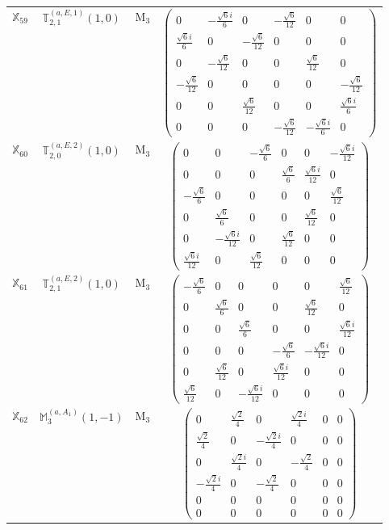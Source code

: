 \documentclass[fleqn,10pt,landscape]{article}
\begin{document}
\begin{itemize}
\begin{center}
\begin{longtable}{c|c|c|c}
$ \mathbb{X}_{59} $ & $\mathbb{T}_{2,1}^{(a,E,1)}(1,0)$ & M$_{3}$ & $\begin{pmatrix} 0 & - \frac{\sqrt{6} i}{6} & 0 & - \frac{\sqrt{6}}{12} & 0 & 0 \\ \frac{\sqrt{6} i}{6} & 0 & - \frac{\sqrt{6}}{12} & 0 & 0 & 0 \\ 0 & - \frac{\sqrt{6}}{12} & 0 & 0 & \frac{\sqrt{6}}{12} & 0 \\ - \frac{\sqrt{6}}{12} & 0 & 0 & 0 & 0 & - \frac{\sqrt{6}}{12} \\ 0 & 0 & \frac{\sqrt{6}}{12} & 0 & 0 & \frac{\sqrt{6} i}{6} \\ 0 & 0 & 0 & - \frac{\sqrt{6}}{12} & - \frac{\sqrt{6} i}{6} & 0 \end{pmatrix}$ \\
$ \mathbb{X}_{60} $ & $\mathbb{T}_{2,0}^{(a,E,2)}(1,0)$ & M$_{3}$ & $\begin{pmatrix} 0 & 0 & - \frac{\sqrt{6}}{6} & 0 & 0 & - \frac{\sqrt{6} i}{12} \\ 0 & 0 & 0 & \frac{\sqrt{6}}{6} & \frac{\sqrt{6} i}{12} & 0 \\ - \frac{\sqrt{6}}{6} & 0 & 0 & 0 & 0 & \frac{\sqrt{6}}{12} \\ 0 & \frac{\sqrt{6}}{6} & 0 & 0 & \frac{\sqrt{6}}{12} & 0 \\ 0 & - \frac{\sqrt{6} i}{12} & 0 & \frac{\sqrt{6}}{12} & 0 & 0 \\ \frac{\sqrt{6} i}{12} & 0 & \frac{\sqrt{6}}{12} & 0 & 0 & 0 \end{pmatrix}$ \\
$ \mathbb{X}_{61} $ & $\mathbb{T}_{2,1}^{(a,E,2)}(1,0)$ & M$_{3}$ & $\begin{pmatrix} - \frac{\sqrt{6}}{6} & 0 & 0 & 0 & 0 & \frac{\sqrt{6}}{12} \\ 0 & \frac{\sqrt{6}}{6} & 0 & 0 & \frac{\sqrt{6}}{12} & 0 \\ 0 & 0 & \frac{\sqrt{6}}{6} & 0 & 0 & \frac{\sqrt{6} i}{12} \\ 0 & 0 & 0 & - \frac{\sqrt{6}}{6} & - \frac{\sqrt{6} i}{12} & 0 \\ 0 & \frac{\sqrt{6}}{12} & 0 & \frac{\sqrt{6} i}{12} & 0 & 0 \\ \frac{\sqrt{6}}{12} & 0 & - \frac{\sqrt{6} i}{12} & 0 & 0 & 0 \end{pmatrix}$ \\
$ \mathbb{X}_{62} $ & $\mathbb{M}_{3}^{(a,A_{1})}(1,-1)$ & M$_{3}$ & $\begin{pmatrix} 0 & \frac{\sqrt{2}}{4} & 0 & \frac{\sqrt{2} i}{4} & 0 & 0 \\ \frac{\sqrt{2}}{4} & 0 & - \frac{\sqrt{2} i}{4} & 0 & 0 & 0 \\ 0 & \frac{\sqrt{2} i}{4} & 0 & - \frac{\sqrt{2}}{4} & 0 & 0 \\ - \frac{\sqrt{2} i}{4} & 0 & - \frac{\sqrt{2}}{4} & 0 & 0 & 0 \\ 0 & 0 & 0 & 0 & 0 & 0 \\ 0 & 0 & 0 & 0 & 0 & 0 \end{pmatrix}$ \\

\end{longtable}
\end{center}
\end{itemize}
\end{document}
